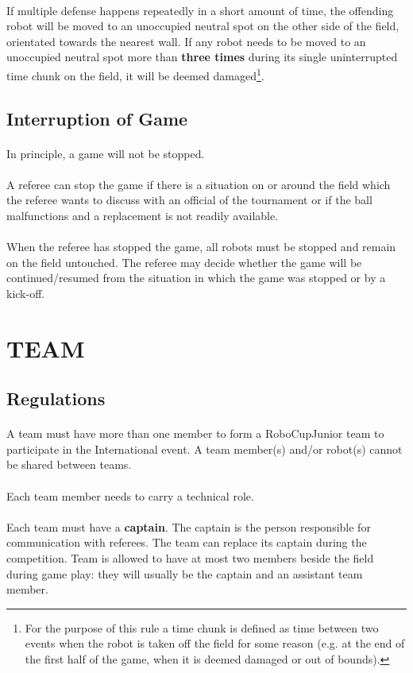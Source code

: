 \documentclass{article}
\newcommand*{\p}{\paragraph{}}
\begin{document}
\p If multiple defense happens repeatedly in a short amount of time, the offending
robot will be moved to an unoccupied neutral spot on the other side of the
field, orientated towards the nearest wall.  If any robot needs to be moved to
an unoccupied neutral spot more than \textbf{three times} during its single
uninterrupted time chunk on the field, it will be deemed damaged\footnote{For
    the purpose of this rule a time chunk is defined as time between two events
    when the robot is taken off the field for some reason (e.g. at the end of
the first half of the game, when it is deemed damaged or out of bounds).}.

\subsection{Interruption of Game \label{ref-interruption}}

\p In principle, a game will not be stopped.

\p A referee can stop the game if there is a situation on or around the field
which the referee wants to discuss with an official of the tournament or if the
ball malfunctions and a replacement is not readily available.

\p When the referee has stopped the game, all robots must be stopped and remain on
the field untouched. The referee may decide whether the game will be
continued/resumed from the situation in which the game was stopped or by a
kick-off.

\section{TEAM \label{ref-015}}

\subsection{Regulations \label{ref-team-regulations}}

\p A team must have more than one member to form a RoboCupJunior team to
participate in the International event. A team member(s) and/or robot(s) cannot
be shared between teams.

\p Each team member needs to carry a technical role.

\p Each team must have a \textbf{captain}. The captain is the person responsible
for communication with referees. The team can replace its captain during the
competition. Team is allowed to have at most two members beside the field
during game play: they will usually be the captain and an assistant team
member.
\end{document}
